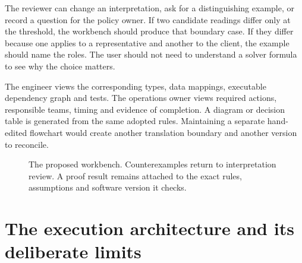 The reviewer can change an interpretation, ask for a distinguishing example, or
record a question for the policy owner. If two candidate readings differ only at
the threshold, the workbench should produce that boundary case. If they differ
because one applies to a representative and another to the client, the example
should name the roles. The user should not need to understand a solver formula
to see why the choice matters.

The engineer views the corresponding types, data mappings, executable dependency
graph and tests. The operations owner views required actions, responsible teams,
timing and evidence of completion. A diagram or decision table is generated from
the same adopted rules. Maintaining a separate hand-edited flowchart would create
another translation boundary and another version to reconcile.

\begin{figure}[htbp]
\centering
{}
\caption{The proposed workbench. Counterexamples return to interpretation review.
A proof result remains attached to the exact rules, assumptions and software
version it checks.}
\label{fig:architecture}
\end{figure}

\section{The execution architecture and its deliberate limits}
\label{merge:P-03-product:07}


